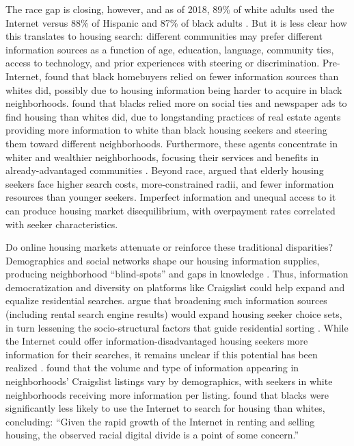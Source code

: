 \documentclass[11pt,letterpaper]{article}
\begin{document}
The race gap is closing, however, and as of 2018, 89\% of white adults used the Internet versus 88\% of Hispanic and 87\% of black adults \citep{pew_research_center_internet_2018}. But it is less clear how this translates to housing search: different communities may prefer different information sources as a function of age, education, language, community ties, access to technology, and prior experiences with steering or discrimination. Pre-Internet, \citet{newburger_sources_1995} found that black homebuyers relied on fewer information sources than whites did, possibly due to housing information being harder to acquire in black neighborhoods. \citet{farley_racial_1996} found that blacks relied more on social ties and newspaper ads to find housing than whites did, due to longstanding practices of real estate agents providing more information to white than black housing seekers and steering them toward different neighborhoods. Furthermore, these agents concentrate in whiter and wealthier neighborhoods, focusing their services and benefits in already-advantaged communities \citep{besbris_investigating_2017}. Beyond race, \citet{deboer_resident_1985} argued that elderly housing seekers face higher search costs, more-constrained radii, and fewer information resources than younger seekers. Imperfect information and unequal access to it can produce housing market disequilibrium, with overpayment rates correlated with seeker characteristics.

Do online housing markets attenuate or reinforce these traditional disparities? Demographics and social networks shape our housing information supplies, producing neighborhood \enquote{blind-spots} and gaps in knowledge \citep{krysan_racial_2009}. Thus, information democratization and diversity on platforms like Craigslist could help expand and equalize residential searches. \citet{krysan_cycle_2017} argue that broadening such information sources (including rental search engine results) would expand housing seeker choice sets, in turn lessening the socio-structural factors that guide residential sorting \citep[cf.][]{sampson_neighborhood_2008,steil_household_2017}. While the Internet could offer information-disadvantaged housing seekers more information for their searches, it remains unclear if this potential has been realized \citep{palm_residential_2001,decker_housing_2010}. \citet{besbris_language_2018} found that the volume and type of information appearing in neighborhoods' Craigslist listings vary by demographics, with seekers in white neighborhoods receiving more information per listing. \citet[][p.~598]{krysan_does_2008} found that blacks were significantly less likely to use the Internet to search for housing than whites, concluding: \enquote{Given the rapid growth of the Internet in renting and selling housing, the observed racial digital divide is a point of some concern.}
\end{document}
